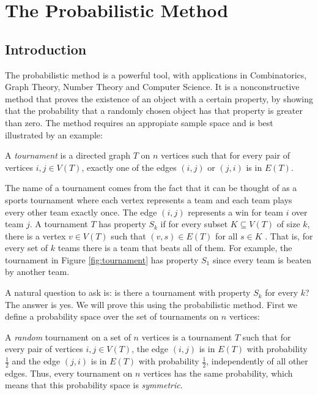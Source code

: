 \chapter{The Probabilistic Method}\label{chap:probmet}

\section{Introduction}\label{sec:probmet:intro}

The probabilistic method is a powerful tool, with applications in Combinatorics, Graph Theory, Number Theory and Computer Science. It is a nonconstructive method that proves the existence of an object with a certain property, by showing that the probability that a randomly chosen object has that property is greater than zero. The method requires an appropiate sample space and is best illustrated by an example: \par

\begin{definition}\label{def:tournament}
A \textit{tournament} is a directed graph $T$ on $n$ vertices such that for every pair of vertices $i, j \in V(T)$, exactly one of the edges $(i, j)$ or $(j, i)$ is in $E(T)$. \cite{alon2016probabilistic} 
\end{definition}

The name of a tournament comes from the fact that it can be thought of as a sports tournament where each vertex represents a team and each team plays every other team exactly once. The edge $(i, j)$ represents a win for team $i$ over team $j$. A tournament $T$ has property $S_k$ if for every subset $K \subseteq V(T)$ of size $k$, there is a vertex $v \in V(T)$ such that $(v, s) \in E(T)$ for all $s \in K$ \cite{alon2016probabilistic}. That is, for every set of $k$ teams there is a team that beats all of them. For example, the tournament in Figure \ref{fig:tournament} has property $S_1$ since every team is beaten by another team. \par

A natural question to ask is: is there a tournament with property $S_k$ for every $k$? The answer is yes. We will prove this using the probabilistic method. First we define a probability space over the set of tournaments on $n$ vertices: \par 
A \textit{random} tournament on a set of $n$ vertices is a tournament $T$ such that for every pair of vertices $i, j \in V(T)$, the edge $(i, j)$ is in $E(T)$ with probability $\frac{1}{2}$ and the edge $(j, i)$ is in $E(T)$ with probability $\frac{1}{2}$, independently of all other edges. Thus, every tournament on $n$ vertices has the same probability, which means that this probability space is \textit{symmetric}. \par

